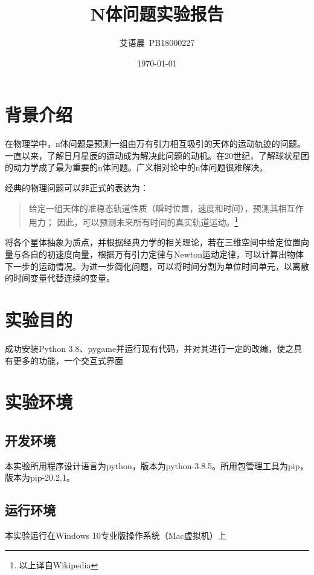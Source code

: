 \documentclass[]{report}
\title{N体问题实验报告}
\author{艾语晨~PB18000227}
\date{\today}
\begin{document}
\theoremstyle{definition} \newtheorem{theorem}{Thm}[section] %
\theoremstyle{definition} \newtheorem{definition}{Def}[section] %
\theoremstyle{plain} \newtheorem{lemma}{lemma}[section] %

	\maketitle
	\newpage

	\tableofcontents
	\newpage

	\chapter{背景介绍}
		在物理学中，n体问题是预测一组由万有引力相互吸引的天体的运动轨迹的问题。一直以来，了解日月星辰的运动成为解决此问题的动机。在20世纪，了解球状星团的动力学成了最为重要的n体问题。广义相对论中的n体问题很难解决。\par
		经典的物理问题可以非正式的表达为：
		\begin{quote}
			给定一组天体的准稳态轨道性质（瞬时位置，速度和时间），预测其相互作用力； 因此，可以预测未来所有时间的真实轨道运动。\footnote{以上译自Wikipedia}
		\end{quote}
		将各个星体抽象为质点，并根据经典力学的相关理论，若在三维空间中给定位置向量与各自的初速度向量，根据万有引力定律与Newton运动定律，可以计算出物体下一步的运动情况。为进一步简化问题，可以将时间分割为单位时间单元，以离散的时间变量代替连续的变量。

		\newpage
	\chapter{实验目的}
		成功安装Python 3.8、pygame并运行现有代码，并对其进行一定的改编，使之具有更多的功能，一个交互式界面

		\newpage
	\chapter{实验环境}
	\section{开发环境}
		本实验所用程序设计语言为python，版本为python-3.8.5。所用包管理工具为pip，版本为pip-20.2.1。
	\section{运行环境}
		本实验运行在Windows 10专业版操作系统（Mac虚拟机）上
\end{document}

